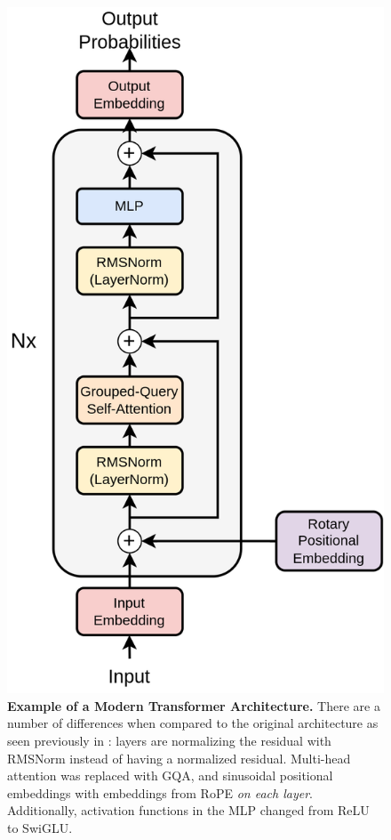 \begin{figure}[!htb]
    \begin{centering}
        \includegraphics[height=0.4\textheight]{img/modern_transformer}
        \caption[Example of a Modern Transformer Architecture]{\textbf{Example of a Modern Transformer Architecture.}
        There are a number of differences when compared to the original architecture as seen previously in :
    layers are normalizing the residual with RMSNorm instead of having a normalized residual.
Multi-head attention was replaced with \gls{GQA}, and sinusoidal positional embeddings with embeddings from \gls{RoPE} {\em on each layer}. Additionally, activation functions in the \gls{MLP} changed from \gls{ReLU} to \gls{SwiGLU}.}
        \label{fig:modern_transformer}
    \end{centering}
\end{figure}

